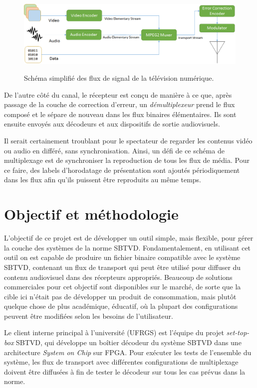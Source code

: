 \documentclass[12pt,a4paper]{article}
\begin{document}
 \begin{figure}[!h]
\centering
\caption{Schéma simplifié des flux de signal de la télévision numérique.}
\includegraphics[width=1\linewidth]{pictures/diagrama_blocos_tvd.png}
\label{fig:diagrama_blocos_tvd}
\end{figure}
 
De l'autre côté du canal, le récepteur est conçu de manière à ce que, après passage de la couche de correction d'erreur, un \textit{démultiplexeur} prend le flux composé et le sépare de nouveau dans les flux binaires élémentaires. Ils sont ensuite envoyés aux décodeurs et aux dispositifs de sortie audiovisuels.

Il serait certainement troublant pour le spectateur de regarder les contenus vidéo ou audio en différé, sans synchronisation. Ainsi, un défi de ce schéma de multiplexage est de synchroniser la reproduction de tous les flux de média. Pour ce faire, des labels d'horodatage de présentation sont ajoutés périodiquement dans les flux afin qu'ils puissent être reproduits au même temps.

\section{Objectif et méthodologie}

L'objectif de ce projet est de développer un outil simple, mais flexible, pour gérer la couche des systèmes de la norme SBTVD. Fondamentalement, en utilisant cet outil on est capable de produire un fichier binaire compatible avec le système SBTVD, contenant un flux de transport qui peut être utilisé pour diffuser du contenu audiovisuel  dans des récepteurs appropriés. Beaucoup de solutions commerciales pour cet objectif sont disponibles sur le marché, de sorte que la cible ici n'était pas de développer un produit de consommation, mais plutôt quelque chose de plus académique, éducatif, où la plupart des configurations peuvent être modifiées selon les besoins de l'utilisateur.

Le client interne principal à l'université (UFRGS) est l'équipe du projet \textit{set-top-box} SBTVD, qui développe un boîtier décodeur du système SBTVD dans une architecture \textit{System on Chip} sur FPGA. Pour exécuter les tests de l'ensemble du système, les flux de transport avec différentes configurations de multiplexage doivent être diffusées à fin de tester le décodeur sur tous les cas prévus dans la norme.
\end{document}
